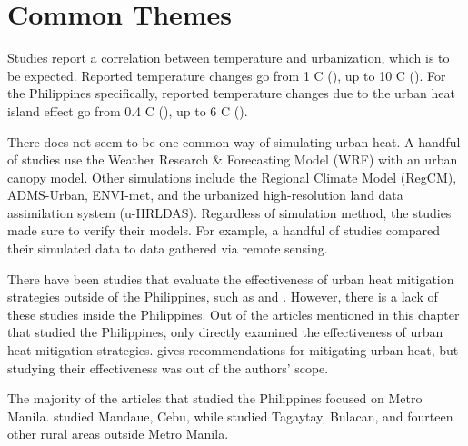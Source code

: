 \section{Common Themes}
	Studies report a correlation between temperature and urbanization, which is to be expected.
	Reported temperature changes go from 1 \degree C (\cite{Huszar2018a}), 
		up to 10 \degree C (\cite{Santamouris2020}).
	For the Philippines specifically, reported temperature changes due to the urban heat island effect go from 0.4 \degree C (\cite{Oliveros2019}),
		up to 6 \degree C (\cite{Purio2022}).
	
	There does not seem to be one common way of simulating urban heat.
	A handful of studies use the Weather Research \& Forecasting Model (WRF) with an urban canopy model.
	Other simulations include the Regional Climate Model (RegCM),
		ADMS-Urban, 
		ENVI-met, and
		the urbanized high-resolution land data assimilation system (u-HRLDAS).
	Regardless of simulation method, the studies made sure to verify their models. For example, a handful of studies compared their simulated data to data gathered via remote sensing.
	
	There have been studies that evaluate the effectiveness of urban heat mitigation strategies outside of the Philippines, such as \textcite{Gao2019} and \textcite{Gao2020}. 
	However, there is a lack of these studies inside the Philippines.
	Out of the articles mentioned in this chapter that studied the Philippines, only \textcite{Cortes2022} directly examined the effectiveness of urban heat mitigation strategies.
	\textcite{Purio2022} gives recommendations for mitigating urban heat, but studying their effectiveness was out of the authors' scope.
	
	The majority of the articles that studied the Philippines focused on Metro Manila.
	\textcite{Cortes2022} studied Mandaue, Cebu, while \textcite{Oliveros2019} studied Tagaytay, Bulacan, and fourteen other rural areas outside Metro Manila.
	
		
